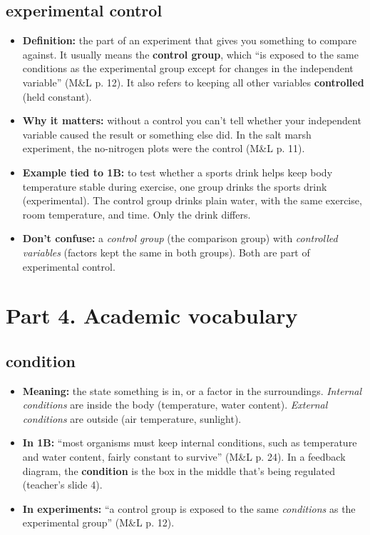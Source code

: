 \documentclass[11pt,letterpaper]{article}
\begin{document}

\subsection{experimental control}
\begin{itemize}
  \item \textbf{Definition:} the part of an experiment that gives you something to compare against. It usually means the \textbf{control group}, which ``is exposed to the same conditions as the experimental group except for changes in the independent variable'' (M\&L p. 12). It also refers to keeping all other variables \textbf{controlled} (held constant).
  \item \textbf{Why it matters:} without a control you can't tell whether your independent variable caused the result or something else did. In the salt marsh experiment, the no-nitrogen plots were the control (M\&L p. 11).
  \item \textbf{Example tied to 1B:} to test whether a sports drink helps keep body temperature stable during exercise, one group drinks the sports drink (experimental). The control group drinks plain water, with the same exercise, room temperature, and time. Only the drink differs.
  \item \textbf{Don't confuse:} a \emph{control group} (the comparison group) with \emph{controlled variables} (factors kept the same in both groups). Both are part of experimental control.
\end{itemize}


\section{Part 4. Academic vocabulary}

\subsection{condition}
\begin{itemize}
  \item \textbf{Meaning:} the state something is in, or a factor in the surroundings. \emph{Internal conditions} are inside the body (temperature, water content). \emph{External conditions} are outside (air temperature, sunlight).
  \item \textbf{In 1B:} ``most organisms must keep internal conditions, such as temperature and water content, fairly constant to survive'' (M\&L p. 24). In a feedback diagram, the \textbf{condition} is the box in the middle that's being regulated (teacher's slide 4).
  \item \textbf{In experiments:} ``a control group is exposed to the same \emph{conditions} as the experimental group'' (M\&L p. 12).
\end{itemize}
\end{document}
